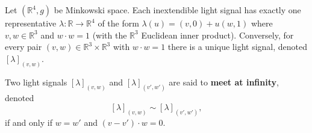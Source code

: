 Let $(\mathbb{R}^4, g)$ be Minkowski space. Each inextendible light signal has exactly one representative $\lambda: \mathbb{R} \to \mathbb{R}^4$ of the form $\lambda(u) = (v, 0) + u(w, 1)$ where $v, w \in \mathbb{R}^3$ and $w \cdot w = 1$ (with the $\mathbb{R}^3$ Euclidean inner product). Conversely, for every pair $(v, w) \in \mathbb{R}^3 \times \mathbb{R}^3$ with $w \cdot w = 1$ there is a unique light signal, denoted $[\lambda]_{(v, w)}$.

Two light signals $[\lambda]_{(v, w)}$ and $[\lambda]_{(v', w')}$ are said to \textbf{meet at infinity}, denoted
$$[\lambda]_{(v, w)} \sim [\lambda]_{(v', w')},$$
if and only if $w = w'$ and $(v - v') \cdot w = 0$.
